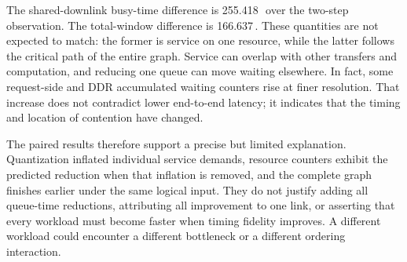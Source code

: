 The shared-downlink busy-time difference is 255.418\,\us\ over the two-step observation. The total-window difference is 166.637\,\us. These quantities are not expected to match: the former is service on one resource, while the latter follows the critical path of the entire graph. Service can overlap with other transfers and computation, and reducing one queue can move waiting elsewhere. In fact, some request-side and DDR accumulated waiting counters rise at finer resolution. That increase does not contradict lower end-to-end latency; it indicates that the timing and location of contention have changed.

The paired results therefore support a precise but limited explanation. Quantization inflated individual service demands, resource counters exhibit the predicted reduction when that inflation is removed, and the complete graph finishes earlier under the same logical input. They do not justify adding all queue-time reductions, attributing all improvement to one link, or asserting that every workload must become faster when timing fidelity improves. A different workload could encounter a different bottleneck or a different ordering interaction.
